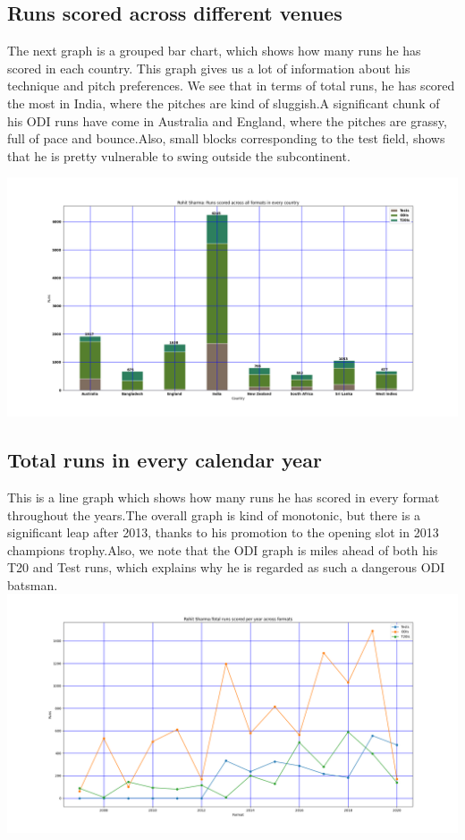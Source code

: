 \documentclass[twoside,10pt,a4paper]{article}
\numberwithin{equation}{section}
\numberwithin{figure}{section}
\begin{document}
\subsection{Runs scored across different venues}
The next graph is a grouped bar chart, which shows how many runs he has scored in each country. This graph gives us a lot of information about his technique and pitch preferences. We see that in terms of total runs, he has scored the most in India, where the pitches are kind of sluggish.A significant chunk of his ODI runs have come in Australia and England, where the pitches are grassy, full of pace and bounce.Also, small blocks corresponding to the test field, shows that he is pretty vulnerable to swing outside the subcontinent.
\begin{center}
    \includegraphics[scale=0.24]{runspercountry.png}
\end{center}
\subsection{Total runs in every calendar year}
This is a line graph which shows how many runs he has scored in every format throughout the years.The overall graph is kind of monotonic, but there is a significant leap after 2013, thanks to his promotion to the opening slot in 2013 champions trophy.Also, we note that the ODI graph is miles ahead of both his T20 and Test runs, which explains why he is regarded as such a dangerous ODI batsman.
\includegraphics[scale=0.24]{Totalruns.png}
\end{document}

